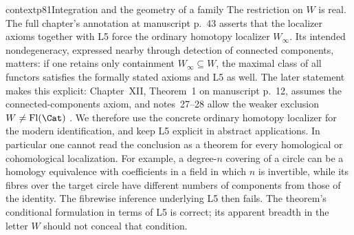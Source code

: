 \begin{dcomment}{context}{p81}{Integration and the geometry of a family}
The restriction on $W$ is real. The full chapter's annotation at manuscript p.~43 asserts that the localizer axioms together with L5 force the ordinary homotopy localizer $W_\infty$. Its intended nondegeneracy, expressed nearby through detection of connected components, matters: if one retains only containment $W_\infty\subseteq W$, the maximal class of all functors satisfies the formally stated axioms and L5 as well. The later statement makes this explicit: Chapter~XII, Theorem~1 on manuscript p.~12, assumes the connected-components axiom, and notes~27--28 allow the weaker exclusion $W\ne\mathrm{Fl}(\Cat)$ \citep{Grothendieck1990XIIa}. We therefore use the concrete ordinary homotopy localizer for the modern identification, and keep L5 explicit in abstract applications. In particular one cannot read the conclusion as a theorem for every homological or cohomological localization. For example, a degree-$n$ covering of a circle can be a homology equivalence with coefficients in a field in which $n$ is invertible, while its fibres over the target circle have different numbers of components from those of the identity. The fibrewise inference underlying L5 then fails. The theorem's conditional formulation in terms of L5 is correct; its apparent breadth in the letter $W$ should not conceal that condition.
\end{dcomment}

